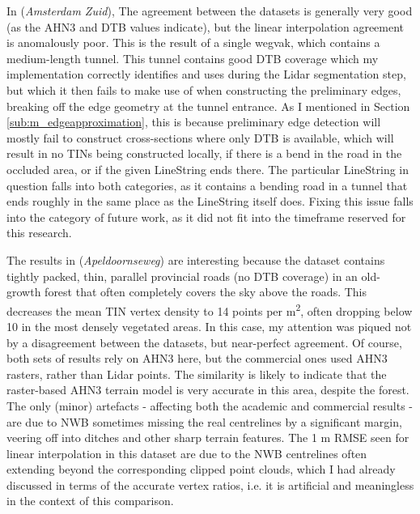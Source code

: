 In  (\textit{Amsterdam Zuid}), The agreement between the datasets is generally very good (as the AHN3 and DTB values indicate), but the linear interpolation agreement is anomalously poor. This is the result of a single wegvak, which contains a medium-length tunnel. This tunnel contains good DTB coverage which my implementation correctly identifies and uses during the Lidar segmentation step, but which it then fails to make use of when constructing the preliminary edges, breaking off the edge geometry at the tunnel entrance. As I mentioned in Section \ref{sub:m_edgeapproximation}, this is because preliminary edge detection will mostly fail to construct cross-sections where only DTB is available, which will result in no TINs being constructed locally, if there is a bend in the road in the occluded area, or if the given LineString ends there. The particular LineString in question falls into both categories, as it contains a bending road in a tunnel that ends roughly in the same place as the LineString itself does. Fixing this issue falls into the category of future work, as it did not fit into the timeframe reserved for this research.

The results in  (\textit{Apeldoornseweg}) are interesting because the dataset contains tightly packed, thin, parallel provincial roads (no DTB coverage) in an old-growth forest that often completely covers the sky above the roads. This decreases the mean TIN vertex density to 14 points per m\textsuperscript{2}, often dropping below 10 in the most densely vegetated areas. In this case, my attention was piqued not by a disagreement between the datasets, but near-perfect agreement. Of course, both sets of results rely on AHN3 here, but the commercial ones used AHN3 rasters, rather than Lidar points. The similarity is likely to indicate that the raster-based AHN3 terrain model is very accurate in this area, despite the forest. The only (minor) artefacts - affecting both the academic and commercial results - are due to NWB sometimes missing the real centrelines by a significant margin, veering off into ditches and other sharp terrain features. The 1 m RMSE seen for linear interpolation in this dataset are due to the NWB centrelines often extending beyond the corresponding clipped point clouds, which I had already discussed in terms of the accurate vertex ratios, i.e. it is artificial and meaningless in the context of this comparison.

